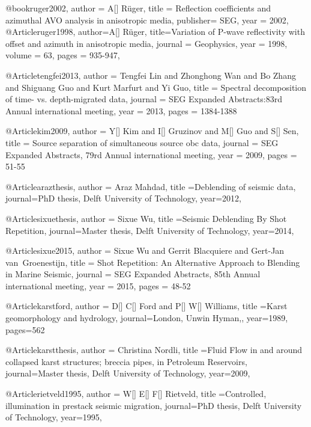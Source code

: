 @book{ruger2002,
  author = 	 {A[] R\"{u}ger},
  title  = 	 {Reflection coefficients and azimuthal AVO analysis in anisotropic media},
  publisher= 	 {SEG},
  year   = 	 2002,
}
@Article{ruger1998,
  author={A[] R\"{u}ger},
  title={Variation of P-wave reflectivity with offset and azimuth in anisotropic media},
  journal = 	 {Geophysics},
  year = 	 1998,
  volume =	 63,
  pages =	 {935-947},
}

@Article{tengfei2013,
  author = 	 {Tengfei Lin and Zhonghong Wan and Bo Zhang and Shiguang Guo and Kurt Marfurt and Yi Guo},
  title = 	 {Spectral decomposition of time- vs. depth-migrated data},
  journal = 	 {SEG Expanded Abstracts:83rd Annual international meeting},
  year = 	 2013,
  pages =	 {1384-1388}
}

@Article{kim2009,
  author = 	 {Y[] Kim and I[] Gruzinov and M[] Guo and S[] Sen},
  title = 	 {Source separation of simultaneous source obc data},
  journal = 	 {SEG Expanded Abstracts, 79rd Annual international meeting},
  year = 	 2009,
  pages =	 {51-55}
}

@Article{arazthesis,
  author = {Araz Mahdad},
  title ={Deblending of seismic data},
  journal={PhD thesis, Delft University of Technology},
  year=2012,
}

@Article{sixuethesis,
  author = {Sixue Wu},
  title ={Seismic Deblending By Shot Repetition},
  journal={Master thesis, Delft University of Technology},
  year=2014,
}

@Article{sixue2015,
  author = 	 {Sixue Wu and Gerrit Blacquiere and Gert-Jan van~Groenestijn},
  title = 	 {Shot Repetition: An Alternative Approach to Blending in Marine Seismic},
  journal = 	 {SEG Expanded Abstracts, 85th Annual international meeting},
  year = 	 2015,
  pages =	 {48-52}
}



@Article{karstford,
  author = {D[] C[] Ford and P[] W[] Williams},
  title ={Karst geomorphology and hydrology},
  journal={London, Unwin Hyman,},
  year=1989,
  pages={562}
}

@Article{karstthesis,
  author = {Christina Nordli},
  title ={Fluid Flow in and around collapsed karst structures; breccia pipes, in
Petroleum Reservoirs},
  journal={Master thesis, Delft University of Technology},
  year=2009,
}


@Article{rietveld1995,
  author = {W[] E[] F[] Rietveld},
  title ={Controlled, illumination in prestack seismic migration},
  journal={PhD thesis, Delft University of Technology},
  year=1995,
}

